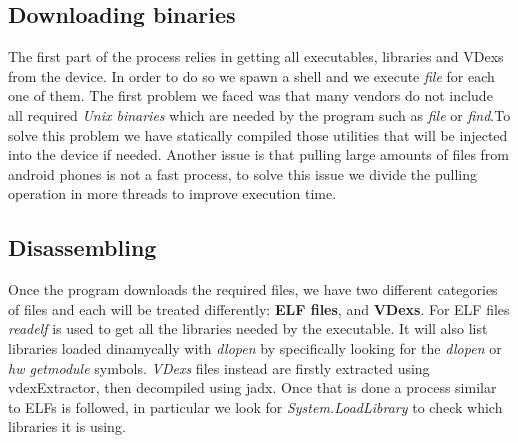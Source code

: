 \documentclass[a4paper,11pt,oneside]{article}
\begin{document}
\subsection{Downloading binaries}
The first part of the process relies in getting all executables, libraries
and VDexs from the device. In order to do so we spawn a shell and we execute
\emph{file} for each one of them. The first problem we faced was that many vendors
do not include all required \emph{Unix binaries} which are needed by the program
such as \emph{file} or \emph{find}.To solve this problem we have statically
compiled those utilities that will be injected into the device if needed.
Another issue is that pulling large amounts of files from android phones is not a fast process, to solve this issue we divide the pulling operation in more threads to improve execution time.

\subsection{Disassembling}
Once the program downloads the required files, we have two different categories
of files and each will be treated differently: \textbf{ELF files},
and \textbf{VDexs}. For ELF files \emph{readelf} is used to get all the libraries
needed by the executable. It will also list libraries loaded dinamycally with \emph{dlopen}
by specifically looking for the \emph{dlopen} or
\emph{hw \textunderscore get\textunderscore module} symbols.
\emph{VDexs} files instead are firstly extracted using vdexExtractor, then
decompiled using jadx. Once that is done a process similar to ELFs is followed,
in particular we look for \emph{System.LoadLibrary} to check which libraries
it is using.
\end{document}
